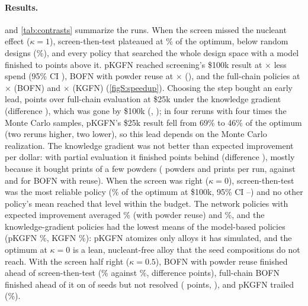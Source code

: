 \documentclass[11pt]{article}
\begin{document}
\paragraph{Results.}  and \cref{tab:contrasts} summarize the
runs. When the screen missed the nucleant effect ($\kappa=1$), screen-then-test
plateaued at \% of the optimum, below random designs
(\%), and every policy that searched the whole design
space with a model finished  to
 points above it. pKGFN reached screening's \$100k result at
$\times$ less spend (95\% CI
), BOFN with powder reuse at
$\times$ (),
and the full-chain policies at $\times$ (BOFN) and
$\times$ (KGFN) (\cref{figS:speedup}). Choosing the
step bought an early lead,  points over full-chain evaluation
at \$25k under the knowledge gradient (difference ), which was
gone by \$100k (, ); in four reruns
with four times the Monte Carlo samples, pKGFN's \$25k result fell from 69\% to
46\% of the optimum (two reruns higher, two lower), so this lead depends on the
Monte Carlo realization. The knowledge
gradient was not better than expected improvement per dollar: with partial
evaluation it finished  points behind (difference
), mostly
because it bought prints of a few powders ( powders and
 prints per run, against  and
 for BOFN with reuse). When the screen was right
($\kappa=0$), screen-then-test was the most reliable policy
(\% of the optimum at \$100k, 95\% CI
--) and no other policy's mean
reached that level within the budget. The network policies with expected
improvement averaged \% (with powder reuse) and
\%, and the knowledge-gradient policies had the
lowest means of the model-based policies (pKGFN \%, KGFN
\%):
pKGFN atomizes only alloys it has simulated, and the optimum at $\kappa=0$ is a
lean, nucleant-free alloy that the seed compositions do not reach.
With the screen half right ($\kappa=0.5$), BOFN with powder reuse finished ahead
of screen-then-test (\% against
\%, difference 
points), full-chain BOFN finished ahead of it on 
of  seeds but not resolved ( points,
), and pKGFN trailed
(\%).
\end{document}
